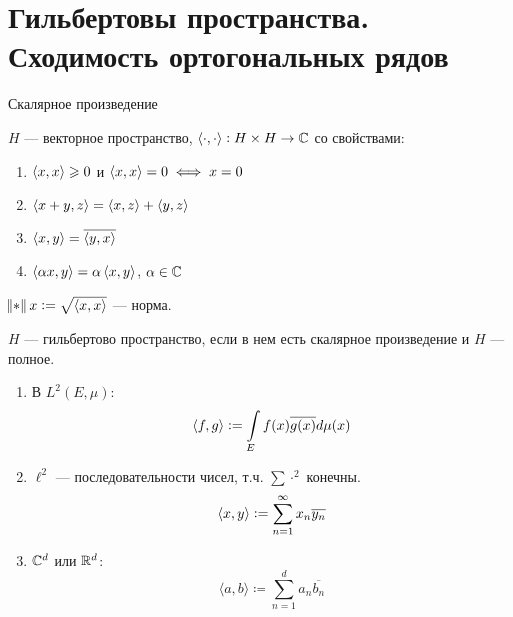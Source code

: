 \section{Гильбертовы пространства. Сходимость ортогональных рядов}

\begin{definition} Скалярное произведение

    $H$ --- векторное пространство,
    $\left\langle \cdot, \cdot \right\rangle: H \times H \to \mathbb{C}$ со свойствами:
    \begin{enumerate}
        \item $\left\langle x, x \right\rangle \geqslant 0$ и $\left\langle x, x \right\rangle = 0 \iff x = 0$
        \item $\left\langle x+y, z \right\rangle = \left\langle x, z \right\rangle + \left\langle y, z \right\rangle$
        \item $\left\langle x, y \right\rangle = \overline{\left\langle y, x \right\rangle}$
        \item $\left\langle \alpha x, y \right\rangle = \alpha \left\langle x, y \right\rangle$, $\alpha \in \mathbb{C}$
    \end{enumerate}
\end{definition}

\begin{observation}
    $\norm{x} := \sqrt{\dotprod{x}{x}}$ --- норма.
\end{observation}

\begin{definition}
    $H$ --- гильбертово пространство, если в нем есть скалярное произведение и $H$ --- полное.
\end{definition}

\begin{examples}
    \begin{enumerate}
        \item В $L^2(E, \mu)$: 
        $$\left\langle f, g \right\rangle := \int\limits_E f(x)\overline{g(x)} d\mu(x)$$
        \item $\ell^2$ --- последовательности чисел, т.ч. $\sum \cdot^2$ конечны.
        $$\left\langle x, y \right\rangle := \sum \limits_{n=1}^\infty x_n\overline{y_n}$$
        \item $\mathbb{C}^d$ или $\mathbb{R}^d$: 
        $$\langle a, b \rangle \coloneqq \sum\limits_{n=1}^{d} a_n \overline{b_n}$$
    \end{enumerate}
\end{examples}

